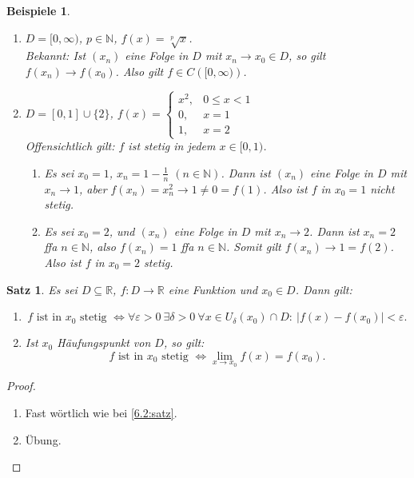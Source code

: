 \documentclass[12pt]{extreport} %
\newcommand{\N}{\mathbb{N}}
\newcommand{\R}{\mathbb{R}}
\theoremstyle{named}
\theoremstyle{itshape}
\newtheorem{satz}[unnamedtheorem]{Satz}
\theoremstyle{normal}
\newtheorem*{beispiele}{Beispiele}
\begin{document}
\begin{beispiele} \
	\begin{enumerate}
		\item $D = [0, \infty)$, $p \in \N$, $f(x) = \sqrt[p]{x}$. \\
		Bekannt: Ist $(x_{n})$ eine Folge in $D$ mit $x_{n} \rightarrow x_{0} \in D$, so gilt $f(x_{n}) \rightarrow f(x_{0})$. Also gilt $f \in C \left([0, \infty)\right)$.
		\item $D = [0, 1] \cup \{ 2 \}$, $ f(x) = \begin{cases}
				x^{2}, & 0 \leq x < 1 \\ 0, & x = 1 \\ 1, & x = 2
			\end{cases}$ \\
			Offensichtlich gilt: $f$ ist stetig in jedem $x \in [0, 1)$. 
			\begin{enumerate}
				\item Es sei $x_{0} = 1$, $x_{n} =1 - \frac{1}{n}$ $(n \in \N)$. Dann ist $(x_{n})$ eine Folge in $D$ mit $x_{n} \rightarrow 1$, aber 
				$f(x_{n}) = x_{n}^{2} \rightarrow 1 \neq 0 = f(1)$. Also ist $f$ in $x_{0} = 1$ nicht stetig.
				\item Es sei $x_{0} =2$, und $(x_{n})$ eine Folge in $D$ mit $x_{n} \rightarrow 2$. Dann ist $x_{n} = 2$ ffa $n \in \N$, 
				also $f(x_{n}) = 1$ ffa $n \in \N$. Somit gilt $f(x_{n}) \rightarrow 1 = f(2)$. Also ist $f$ in $x_{0} = 2$ stetig.
			\end{enumerate}	
	\end{enumerate}	
\end{beispiele}


\begin{satz} \label{7.1:satz}
	Es sei $D \subseteq \R$, $f \colon D \rightarrow \R$ eine Funktion und $x_{0} \in D$. Dann gilt:
	\begin{enumerate}
		\item 	$$ f \text{ ist in } x_{0} \text{ stetig }  \iff  \forall \varepsilon > 0 ~ \exists \delta > 0 ~ 
			\forall x \in U_{\delta}(x_{0}) \cap D: ~ |f(x) - f(x_{0})| < \varepsilon.$$
		\item Ist $x_{0}$ Häufungspunkt von $D$, so gilt:
			$$ f \text{ ist in } x_{0} \text{ stetig } \iff \lim_{x \rightarrow x_{0}} f(x) = f(x_{0}). $$
	\end{enumerate}
\end{satz}

\begin{proof} \
	\begin{enumerate}
		\item Fast wörtlich wie bei \ref{6.2:satz}.
		\item Übung.
	\end{enumerate}
\end{proof}
\end{document}
